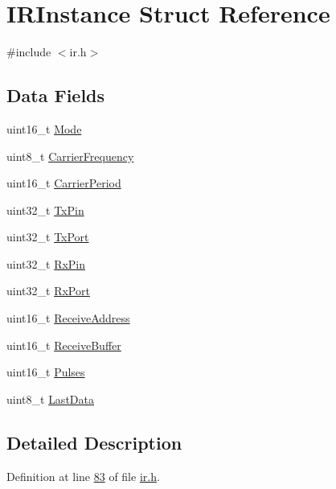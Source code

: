 \hypertarget{struct_i_r_instance}{\section{I\-R\-Instance Struct Reference}
\label{struct_i_r_instance}
}


{\ttfamily \#include $<$ir.\-h$>$}

\subsection*{Data Fields}
\begin{DoxyCompactItemize}
\item 
uint16\-\_\-t \hyperlink{struct_i_r_instance_a08ae347b1b1741d54a0e1472bebe0c41}{Mode}
\item 
uint8\-\_\-t \hyperlink{struct_i_r_instance_a23a3063e6f24eaca78f9e0db2f3bd07f}{Carrier\-Frequency}
\item 
uint16\-\_\-t \hyperlink{struct_i_r_instance_a7ce4e156e8b335f4ab8da1ab95e8bb78}{Carrier\-Period}
\item 
uint32\-\_\-t \hyperlink{struct_i_r_instance_ad8db5c2b6d458ef94408fc171aa7fabc}{Tx\-Pin}
\item 
uint32\-\_\-t \hyperlink{struct_i_r_instance_a0491d3193cddc5b568be222f147dcfcc}{Tx\-Port}
\item 
uint32\-\_\-t \hyperlink{struct_i_r_instance_ab9fd2a831b0252be9553645df9250c54}{Rx\-Pin}
\item 
uint32\-\_\-t \hyperlink{struct_i_r_instance_a5202eb791e1291a983144f72a457d38d}{Rx\-Port}
\item 
uint16\-\_\-t \hyperlink{struct_i_r_instance_a76f9d50da2a9a8c4e4ee3f61e2296514}{Receive\-Address}
\item 
uint16\-\_\-t \hyperlink{struct_i_r_instance_aba9722c0b3b4643583f06d05d23bc54d}{Receive\-Buffer}
\item 
uint16\-\_\-t \hyperlink{struct_i_r_instance_a374091556baaf95cb29a195e877efc1c}{Pulses}
\item 
uint8\-\_\-t \hyperlink{struct_i_r_instance_a5d62b35c44888dcb86452195478269fe}{Last\-Data}
\end{DoxyCompactItemize}


\subsection{Detailed Description}


Definition at line \hyperlink{ir_8h_source_l00083}{83} of file \hyperlink{ir_8h_source}{ir.\-h}.



